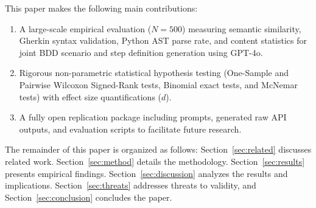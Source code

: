 This paper makes the following main contributions:
\begin{enumerate}
    \item A large-scale empirical evaluation ($N=500$) measuring semantic similarity, Gherkin syntax validation, Python AST parse rate, and content statistics for joint BDD scenario and step definition generation using GPT-4o.
    \item Rigorous non-parametric statistical hypothesis testing (One-Sample and Pairwise Wilcoxon Signed-Rank tests, Binomial exact tests, and McNemar tests) with effect size quantifications ($d$).
    \item A fully open replication package including prompts, generated raw API outputs, and evaluation scripts to facilitate future research.
\end{enumerate}

The remainder of this paper is organized as follows: Section~\ref{sec:related} discusses related work. Section~\ref{sec:method} details the methodology. Section~\ref{sec:results} presents empirical findings. Section~\ref{sec:discussion} analyzes the results and implications. Section~\ref{sec:threats} addresses threats to validity, and Section~\ref{sec:conclusion} concludes the paper.
